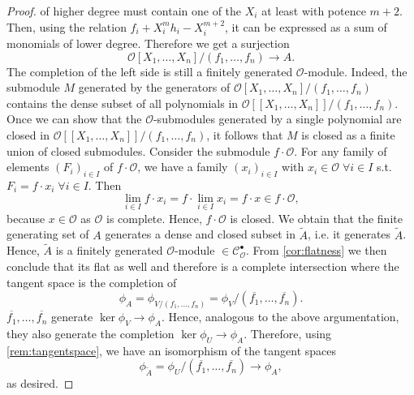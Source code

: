 \documentclass{article}
\theoremstyle{plain}%
\theoremstyle{definition}
\theoremstyle{remark}
\newcommand{\cob}{\mathcal{C}_\mathcal{O}^\bullet}
\begin{document}
\begin{proof}
    of higher degree must contain one of the \(X_i\) at least with potence \(m+2\). Then, using
    the relation \(f_i + X_i^mh_i - X_i^{m+2}\), it can be expressed as a sum of 
    monomials of lower degree.
    Therefore we get a surjection 
    \[
        \mathcal{O}[X_1, \dots, X_n]/(f_1, \dots, f_n) \to A.  
    \]
    The completion of the left side is still a finitely generated \(\mathcal{O}\)-module.
    Indeed, the submodule \(M\) generated by the generators of \(\mathcal{O}[X_1, \dots, X_n]/(f_1, \dots, f_n)\) 
    contains the dense subset of all polynomials in \(\mathcal{O}[[X_1, \dots, X_n]]/(f_1, \dots, f_n)\).
    Once we can show that the \(\mathcal{O}\)-submodules generated by a single polynomial are closed in 
    \(\mathcal{O}[[X_1, \dots, X_n]]/(f_1, \dots, f_n)\), it follows that \(M\) is closed
    as a finite union of closed submodules. Consider the submodule \(f \cdot \mathcal{O}\).
    For any family of elements \((F_i)_{i \in I}\) of \(f \cdot \mathcal{O}\), we have a family 
    \((x_i)_{i \in I}\) with \(x_i \in \mathcal{O} \; \forall i \in I\) s.t. \(F_i = f\cdot x_i \; \forall i \in I\).
    Then
    \[
        \lim\limits_{i\in I} f\cdot x_i = f \cdot \lim\limits_{i \in I} x_i = f \cdot x \in f \cdot \mathcal{O},
    \]
    because \(x \in \mathcal{O}\) as \(\mathcal{O}\) is complete. Hence, \(f\cdot \mathcal{O}\) is closed.
    We obtain that the finite generating set of \(A\) generates a dense and closed subset in \(\tilde{A}\),
    i.e. it generates \(\tilde{A}\).
    Hence, \(\tilde{A}\) is a finitely generated \(\mathcal{O}\)-module \(\in \cob\). 
    From \cref{cor:flatness} we then conclude that its flat as well and therefore
    is a complete intersection where the tangent space is the completion of 
    \[
        \phi_A = \phi_{V/(f_1, \dots, f_n)} = \phi_V/(\overline{f_1}, \dots, \overline{f_n}).
    \]
    \(\overline{f_1}, \dots, \overline{f_n}\) generate \(\ker \phi_V \to \phi_A\). Hence, analogous to the
    above argumentation, they also generate the completion \(\ker \phi_U \to \phi_A\). 
    Therefore, using \cref{rem:tangentspace}, we have an isomorphism of the tangent spaces 
    \[
        \phi_{\tilde{A}} = \phi_U/(\overline{f_1}, \dots, \overline{f_n}) \to \phi_A,
    \]
    as desired.
\end{proof}
\end{document}
